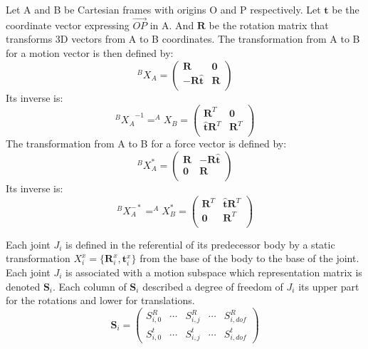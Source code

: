 Let A and B be Cartesian frames with origins O and P respectively. Let $\mathbf{t}$ be the coordinate vector expressing $\overrightarrow{OP}$ in A. And $\mathbf{R}$ be the rotation matrix that transforms 3D vectors from A to B coordinates.
The transformation from A to B for a motion vector is then defined by:
\begin{equation}
  ^BX_A =
  \begin{pmatrix}
    \mathbf{R} & \mathbf{0} \\
    -\mathbf{R}\hat{\mathbf{t}} & \mathbf{R} \\
  \end{pmatrix}
\end{equation}
Its inverse is:
\begin{equation}
  {^BX_A}^{-1} = ^AX_B =
  \begin{pmatrix}
    \mathbf{R}^T & \mathbf{0} \\
    \hat{\mathbf{t}}\mathbf{R}^T & \mathbf{R}^T \\
  \end{pmatrix}
\end{equation}
The transformation from A to B for a force vector is defined by:
\begin{equation}
  ^BX_A^* =
  \begin{pmatrix}
    \mathbf{R} & -\mathbf{R}\hat{\mathbf{t}} \\
    \mathbf{0} & \mathbf{R} \\
  \end{pmatrix}
\end{equation}
Its inverse is:
\begin{equation}
  ^BX_A^{-*} = ^AX_B^* =
  \begin{pmatrix}
    \mathbf{R}^T & \hat{\mathbf{t}}\mathbf{R}^T \\
    \mathbf{0} & \mathbf{R}^T \\
  \end{pmatrix}
\end{equation}

Each joint $J_i$ is defined in the referential of its predecessor body by a static transformation $X^x_i = \{\mathbf{R}^x_i, \mathbf{t}^x_i\}$ from the base of the body to the base of the joint.
Each joint $J_i$ is associated with a motion subspace which representation matrix is denoted $\mathbf{S}_i$. Each column of $\mathbf{S}_i$ described a degree of freedom of $J_i$ its upper part for the rotations and lower for translations.
\begin{equation}
  \mathbf{S}_i =
  \begin{pmatrix}
    S^R_{i,0} & \cdots &
    S^R_{i,j} & \cdots &
    S^R_{i,dof} \\
    S^t_{i,0} & \cdots &
    S^t_{i,j} & \cdots &
    S^t_{i,dof}
  \end{pmatrix}
\end{equation}

